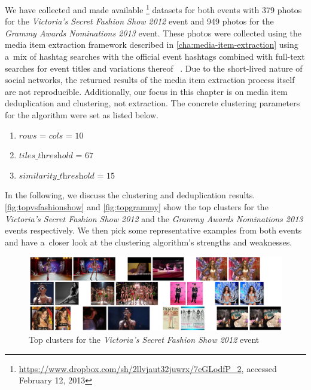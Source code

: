We have collected and made available%
\footnote{\url{https://www.dropbox.com/sh/2llvjaut32juwrx/7eGLodfP_2},
accessed February 12, 2013}
datasets for both events with
379 photos for the \emph{Victoria's Secret Fashion Show 2012} event 
and 949 photos for the \emph{Grammy Awards Nominations 2013} event.
These photos were collected using the media item extraction framework
described in \autoref{cha:media-item-extraction}
using a~mix of hashtag searches with the official event hashtags combined
with full-text searches for event titles and variations thereof~%
\cite{becker2010eventidentification,becker2012plannedevents}.
Due to the short-lived nature of social networks,
the returned results of the media item extraction process itself
are not reproducible.
Additionally, our focus in this chapter
is on media item deduplication and clustering, not extraction.
The concrete clustering parameters for the algorithm were set as listed below.

\begin{enumerate}
  \item $\textit{rows}$ = $\textit{cols}$ = $10$
  \item $\textit{tiles\_threshold}$ = $67$
  \item $\textit{similarity\_threshold}$ = $15$
\end{enumerate}

In the following, we discuss the clustering and deduplication results.
\autoref{fig:topvsfashionshow} and \autoref{fig:topgrammy} show the top clusters
for the \emph{Victoria's Secret Fashion Show 2012} and the 
\emph{Grammy Awards Nominations 2013} events respectively.
We then pick some representative examples from both events
and have a~closer look at the clustering algorithm's strengths and weaknesses.

\begin{figure}[!ht]
  \centering
  \includegraphics[width=1.0\linewidth]{./vsfashionshow_clusters.png}
  \caption{Top clusters for the \emph{Victoria's Secret Fashion Show 2012} event}
  \label{fig:topvsfashionshow}
\end{figure}

